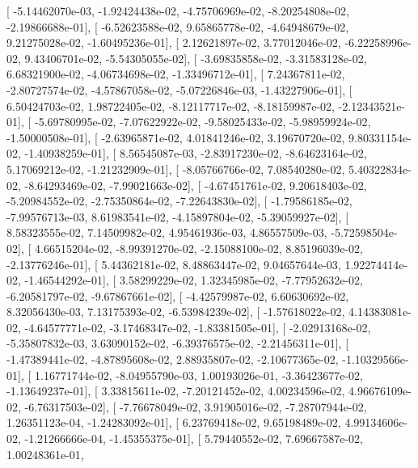 \documentclass{article}
\begin{document}
       [ -5.14462070e-03,  -1.92424438e-02,  -4.75706969e-02,
         -8.20254808e-02,  -2.19866688e-01],
       [ -6.52623588e-02,   9.65865778e-02,  -4.64948679e-02,
          9.21275028e-02,  -1.60495236e-01],
       [  2.12621897e-02,   3.77012046e-02,  -6.22258996e-02,
          9.43406701e-02,  -5.54305055e-02],
       [ -3.69835858e-02,  -3.31583128e-02,   6.68321900e-02,
         -4.06734698e-02,  -1.33496712e-01],
       [  7.24367811e-02,  -2.80727574e-02,  -4.57867058e-02,
         -5.07226846e-03,  -1.43227906e-01],
       [  6.50424703e-02,   1.98722405e-02,  -8.12117717e-02,
         -8.18159987e-02,  -2.12343521e-01],
       [ -5.69780995e-02,  -7.07622922e-02,  -9.58025433e-02,
         -5.98959924e-02,  -1.50000508e-01],
       [ -2.63965871e-02,   4.01841246e-02,   3.19670720e-02,
          9.80331154e-02,  -1.40938259e-01],
       [  8.56545087e-03,  -2.83917230e-02,  -8.64623164e-02,
          5.17069212e-02,  -1.21232909e-01],
       [ -8.05766766e-02,   7.08540280e-02,   5.40322834e-02,
         -8.64293469e-02,  -7.99021663e-02],
       [ -4.67451761e-02,   9.20618403e-02,  -5.20984552e-02,
         -2.75350864e-02,  -7.22643830e-02],
       [ -1.79586185e-02,  -7.99576713e-03,   8.61983541e-02,
         -4.15897804e-02,  -5.39059927e-02],
       [  8.58323555e-02,   7.14509982e-02,   4.95461936e-03,
          4.86557509e-03,  -5.72598504e-02],
       [  4.66515204e-02,  -8.99391270e-02,  -2.15088100e-02,
          8.85196039e-02,  -2.13776246e-01],
       [  5.44362181e-02,   8.48863447e-02,   9.04657644e-03,
          1.92274414e-02,  -1.46544292e-01],
       [  3.58299229e-02,   1.32345985e-02,  -7.77952632e-02,
         -6.20581797e-02,  -9.67867661e-02],
       [ -4.42579987e-02,   6.60630692e-02,   8.32056430e-03,
          7.13175393e-02,  -6.53984239e-02],
       [ -1.57618022e-02,   4.14383081e-02,  -4.64577771e-02,
         -3.17468347e-02,  -1.83381505e-01],
       [ -2.02913168e-02,  -5.35807832e-03,   3.63090152e-02,
         -6.39376575e-02,  -2.21456311e-01],
       [ -1.47389441e-02,  -4.87895608e-02,   2.88935807e-02,
         -2.10677365e-02,  -1.10329566e-01],
       [  1.16771744e-02,  -8.04955790e-03,   1.00193026e-01,
         -3.36423677e-02,  -1.13649237e-01],
       [  3.33815611e-02,  -7.20121452e-02,   4.00234596e-02,
          4.96676109e-02,  -6.76317503e-02],
       [ -7.76678049e-02,   3.91905016e-02,  -7.28707944e-02,
          1.26351123e-04,  -1.24283092e-01],
       [  6.23769418e-02,   9.65198489e-02,   4.99134606e-02,
         -1.21266666e-04,  -1.45355375e-01],
       [  5.79440552e-02,   7.69667587e-02,   1.00248361e-01,
\end{document}
